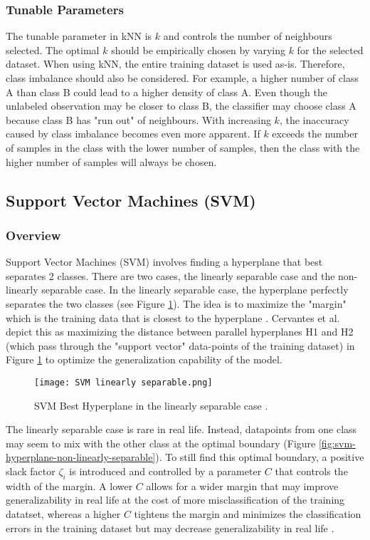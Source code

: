 \subsubsection{Tunable Parameters}
The tunable parameter in kNN is $k$ and controls the number of neighbours selected. The optimal $k$ should be empirically chosen by varying $k$ for the selected dataset. When using kNN, the entire training dataset is used as-is. Therefore, class imbalance should also be considered. For example, a higher number of class A than class B could lead to a higher density of class A. Even though the unlabeled observation may be closer to class B, the classifier may choose class A because class B has "run out" of neighbours. With increasing $k$, the inaccuracy caused by class imbalance becomes even more apparent. If $k$ exceeds the number of samples in the class with the lower number of samples, then the class with the higher number of samples will always be chosen.

\subsection{Support Vector Machines (SVM)}
\subsubsection{Overview}
Support Vector Machines (SVM) involves finding a hyperplane that best separates 2 classes. There are two cases, the linearly separable case and the non-linearly separable case. In the linearly separable case, the hyperplane perfectly separates the two classes (see Figure \ref{fig:svm-hyperplane}). The idea is to maximize the "margin" which is the training data that is closest to the hyperplane \cite{cervantesComprehensiveSurveySupport2020}. Cervantes et al. depict this as maximizing the distance between parallel hyperplanes H1 and H2 (which pass through the "support vector" data-points of the training dataset) in Figure \ref{fig:svm-hyperplane} to optimize the generalization capability of the model.

\begin{figure}[ht]
    \centering
    \texttt{[image: SVM linearly separable.png]}
    \caption{SVM Best Hyperplane in the linearly separable case \cite{cervantesComprehensiveSurveySupport2020}.}
    \label{fig:svm-hyperplane}
\end{figure}

The linearly separable case is rare in real life. Instead, datapoints from one class may seem to mix with the other class at the optimal boundary (Figure \ref{fig:svm-hyperplane-non-linearly-separable}). To still find this optimal boundary, a positive slack factor $\zeta_i$ is introduced and controlled by a parameter $C$ that controls the width of the margin. A lower $C$ allows for a wider margin that may improve generalizability in real life at the cost of more misclassification of the training datatset, whereas a higher $C$ tightens the margin and minimizes the classification errors in the training dataset but may decrease generalizability in real life \cite{cervantesComprehensiveSurveySupport2020}.  

